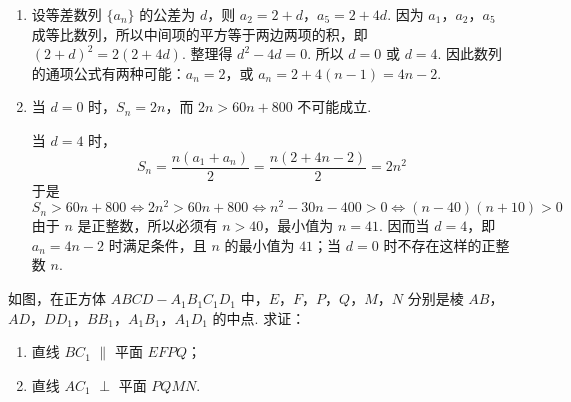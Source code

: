 \begin{solution}
\begin{enumerate}
\item
设等差数列 \(\{a_n\}\) 的公差为 \(d\)，则 \(a_2=2+d\)，\(a_5=2+4d\).
因为 \(a_1\)，\(a_2\)，\(a_5\) 成等比数列，所以中间项的平方等于两边两项的积，即 \((2+d)^2=2(2+4d)\). 整理得 \(d^2-4d=0\).
所以 \(d=0\) 或 \(d=4\). 因此数列的通项公式有两种可能：\(a_n=2\)，或 \(a_n=2+4(n-1)=4n-2\).

\item 当 \(d=0\) 时，\(S_n=2n\)，而 \(2n>60n+800\) 不可能成立.

当 \(d=4\) 时，
\[
S_n=\frac{n\left(a_1+a_n\right)}{2}
=\frac{n\left(2+4n-2\right)}{2}=2n^2
\]
于是
\[
S_n>60n+800\Longleftrightarrow 2n^2>60n+800
\Longleftrightarrow n^2-30n-400>0
\Longleftrightarrow (n-40)(n+10)>0
\]
由于 \(n\) 是正整数，所以必须有 \(n>40\)，最小值为 \(n=41\). 因而当 \(d=4\)，即 \(a_n=4n-2\) 时满足条件，且 \(n\) 的最小值为 \(41\)；当 \(d=0\) 时不存在这样的正整数 \(n\).
 \end{enumerate}
 \end{solution}

\begin{problem}
如图，在正方体 \(ABCD - A_{1}B_{1}C_{1}D_{1}\) 中，\(E\)，\(F\)，\(P\)，\(Q\)，\(M\)，\(N\) 分别是棱 \(AB\)，\(AD\)，\(DD_{1}\)，\(BB_{1}\)，\(A_{1}B_{1}\)，\(A_{1}D_{1}\) 的中点. 求证：

\begin{enumerate}
\item 直线 \(BC_{1}\) \(\parallel\) 平面 \(EFPQ\)；
\item 直线 \(AC_{1}\) \(\perp\) 平面 \(PQMN\).
\end{enumerate}

\end{problem}

